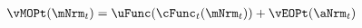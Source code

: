   \begin{equation}\begin{gathered}\begin{aligned}
\vMOPt(\mNrm_{t}) & = \uFunc(\cFunc_{t}(\mNrm_{t})) + \vEOPt(\aNrm_{t}) \label{eq:vMOPt}
      \end{aligned}\end{gathered}\end{equation}
